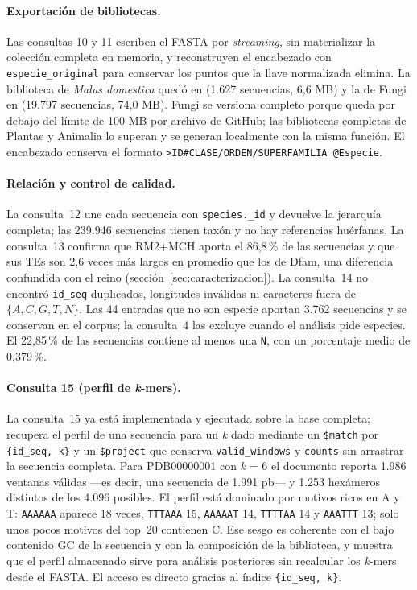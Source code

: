 \documentclass[journal]{IEEEtran}
\begin{document}
\paragraph*{Exportación de bibliotecas.}
Las consultas 10 y 11 escriben el FASTA por \textit{streaming}, sin materializar la
colección completa en memoria, y reconstruyen el encabezado con \texttt{especie\_original}
para conservar los puntos que la llave normalizada elimina. La biblioteca de
\textit{Malus domestica} quedó en  (1.627
secuencias, 6,6 MB) y la de Fungi en  (19.797 secuencias,
74,0 MB). Fungi se versiona completo porque queda por debajo del límite de 100 MB por
archivo de GitHub; las bibliotecas completas de Plantae y Animalia lo superan y se generan
localmente con la misma función. El encabezado conserva el formato
\texttt{>ID\#CLASE/ORDEN/SUPERFAMILIA @Especie}.

\paragraph*{Relación y control de calidad.}
La consulta~12 une cada secuencia con \texttt{species.\_id} y devuelve la jerarquía
completa; las 239.946 secuencias tienen taxón y no hay referencias huérfanas. La consulta~13
confirma que RM2+MCH aporta el 86,8\,\% de las secuencias y que sus TEs son 2,6 veces más
largos en promedio que los de Dfam, una diferencia confundida con el reino
(sección~\ref{sec:caracterizacion}). La consulta~14 no encontró \texttt{id\_seq} duplicados,
longitudes inválidas ni caracteres fuera de $\{A,C,G,T,N\}$. Las 44 entradas que no son
especie aportan 3.762 secuencias y se conservan en el corpus; la consulta~4 las excluye
cuando el análisis pide especies. El 22,85\,\% de las secuencias contiene al menos una
\texttt{N}, con un porcentaje medio de 0,379\,\%.

\paragraph*{Consulta 15 (perfil de \textit{k}-mers).}
La consulta~15 ya está implementada y ejecutada sobre la base completa; recupera el perfil
de una secuencia para un \textit{k} dado mediante un \texttt{\$match} por
\texttt{\{id\_seq, k\}} y un \texttt{\$project} que conserva \texttt{valid\_windows} y
\texttt{counts} sin arrastrar la secuencia completa. Para PDB00000001 con \textit{k} = 6 el
documento reporta 1.986 ventanas válidas ---es decir, una secuencia de 1.991 pb--- y 1.253
hexámeros distintos de los 4.096 posibles. El perfil está dominado por motivos ricos en A y
T: \texttt{AAAAAA} aparece 18 veces, \texttt{TTTAAA} 15, \texttt{AAAAAT} 14,
\texttt{TTTTAA} 14 y \texttt{AAATTT} 13; solo unos pocos motivos del top~20 contienen C.
Ese sesgo es coherente con el bajo contenido GC de la secuencia y con la composición de la
biblioteca, y muestra que el perfil almacenado sirve para análisis posteriores sin
recalcular los \textit{k}-mers desde el FASTA. El acceso es directo gracias al índice
\texttt{\{id\_seq, k\}}.
\end{document}
